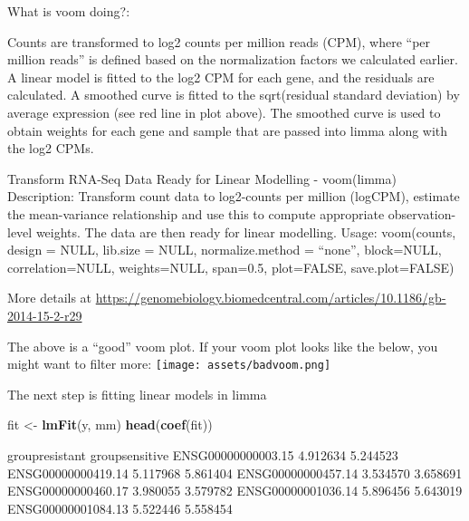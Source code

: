 \documentclass[
]{article}
\newenvironment{Shaded}{\begin{snugshade}}{\end{snugshade}}
\newcommand{\FunctionTok}[1]{\textcolor[rgb]{0.13,0.29,0.53}{\textbf{#1}}}
\newcommand{\NormalTok}[1]{#1}
\newcommand{\OtherTok}[1]{\textcolor[rgb]{0.56,0.35,0.01}{#1}}
\begin{document}
What is voom doing?:

Counts are transformed to log2 counts per million reads (CPM), where
``per million reads'' is defined based on the normalization factors we
calculated earlier. A linear model is fitted to the log2 CPM for each
gene, and the residuals are calculated. A smoothed curve is fitted to
the sqrt(residual standard deviation) by average expression (see red
line in plot above). The smoothed curve is used to obtain weights for
each gene and sample that are passed into limma along with the log2
CPMs.

Transform RNA-Seq Data Ready for Linear Modelling - voom(limma)
Description: Transform count data to log2-counts per million (logCPM),
estimate the mean-variance relationship and use this to compute
appropriate observation-level weights. The data are then ready for
linear modelling. Usage: voom(counts, design = NULL, lib.size = NULL,
normalize.method = ``none'', block=NULL, correlation=NULL, weights=NULL,
span=0.5, plot=FALSE, save.plot=FALSE)

More details at
\url{https://genomebiology.biomedcentral.com/articles/10.1186/gb-2014-15-2-r29}

The above is a ``good'' voom plot. If your voom plot looks like the
below, you might want to filter more:
\texttt{[image: assets/badvoom.png]}

The next step is fitting linear models in limma

\begin{Shaded}
\begin{Highlighting}[]
\NormalTok{fit }\OtherTok{\textless{}{-}} \FunctionTok{lmFit}\NormalTok{(y, mm)}
\FunctionTok{head}\NormalTok{(}\FunctionTok{coef}\NormalTok{(fit))}
\end{Highlighting}
\end{Shaded}

\begin{Shaded}
\begin{Highlighting}[]
\NormalTok{                   groupresistant groupsensitive}
\NormalTok{ENSG00000000003.15       4.912634       5.244523}
\NormalTok{ENSG00000000419.14       5.117968       5.861404}
\NormalTok{ENSG00000000457.14       3.534570       3.658691}
\NormalTok{ENSG00000000460.17       3.980055       3.579782}
\NormalTok{ENSG00000001036.14       5.896456       5.643019}
\NormalTok{ENSG00000001084.13       5.522446       5.558454}
\end{Highlighting}
\end{Shaded}
\end{document}
